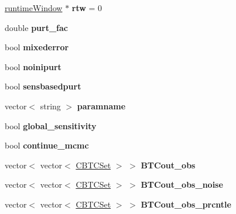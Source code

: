 \begin{DoxyCompactItemize}
\mbox{\label{class_c_m_c_m_c_a874e66fb4038bf88c225199ae6502d5a}} 
\hyperlink{classruntime_window}{runtime\+Window} $\ast$ {\bfseries rtw} = 0
\item 
\mbox{\label{class_c_m_c_m_c_a899aa9ce61837586d0d2a53e72fcd25d}} 
double {\bfseries purt\+\_\+fac}
\item 
\mbox{\label{class_c_m_c_m_c_a739ed09aa9b6808d71f6abb3eebd348f}} 
bool {\bfseries mixederror}
\item 
\mbox{\label{class_c_m_c_m_c_a5b94666fae10f89b33e069a848cc43d6}} 
bool {\bfseries noinipurt}
\item 
\mbox{\label{class_c_m_c_m_c_a7c2a624418d504875386a7aa2bb59d16}} 
bool {\bfseries sensbasedpurt}
\item 
\mbox{\label{class_c_m_c_m_c_a719855ac6702721f36ad423ba706f5ff}} 
vector$<$ string $>$ {\bfseries paramname}
\item 
\mbox{\label{class_c_m_c_m_c_a3ff3ae80731a07f90d94e44db918f535}} 
bool {\bfseries global\+\_\+sensitivity}
\item 
\mbox{\label{class_c_m_c_m_c_adcd021d45f5168a9af97e3a95c1cacbe}} 
bool {\bfseries continue\+\_\+mcmc}
\item 
\mbox{\label{class_c_m_c_m_c_aaa626804f78e2144128edf94961d62f5}} 
vector$<$ vector$<$ \hyperlink{class_c_b_t_c_set}{C\+B\+T\+C\+Set} $>$ $>$ {\bfseries B\+T\+Cout\+\_\+obs}
\item 
\mbox{\label{class_c_m_c_m_c_a65ebd7c576a96ace873873f6366eba18}} 
vector$<$ vector$<$ \hyperlink{class_c_b_t_c_set}{C\+B\+T\+C\+Set} $>$ $>$ {\bfseries B\+T\+Cout\+\_\+obs\+\_\+noise}
\item 
\mbox{\label{class_c_m_c_m_c_a7a52e79005db78243fb18d249886e508}} 
vector$<$ vector$<$ \hyperlink{class_c_b_t_c_set}{C\+B\+T\+C\+Set} $>$ $>$ {\bfseries B\+T\+Cout\+\_\+obs\+\_\+prcntle}
\item 
\mbox{\label{class_c_m_c_m_c_ae94ca71b1524ca03ee0ce77cf9c5d279}} 

\end{DoxyCompactItemize}
